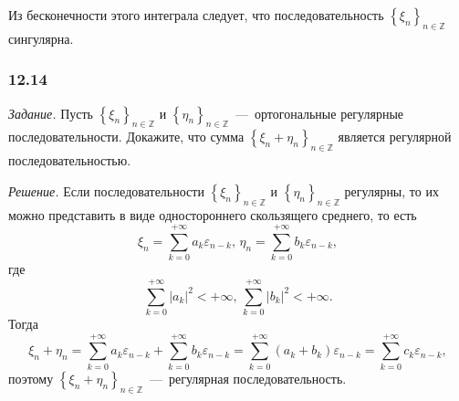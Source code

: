 Из бесконечности этого интеграла следует,
что последовательность $ \left\{ \xi_n \right\}_{n \in \mathbb{Z}}$ сингулярна.

\subsubsection*{12.14}

\textit{Задание.}
Пусть $ \left\{ \xi_n \right\}_{n \in \mathbb{Z}}$ и
$ \left\{ \eta_n \right\}_{n \in \mathbb{Z}}$~---~ортогональные регулярные последовательности.
Докажите, что сумма $ \left\{ \xi_n + \eta_n \right\}_{n \in \mathbb{Z}}$
является регулярной последовательностью.

\textit{Решение.}
Если последовательности $ \left\{ \xi_n \right\}_{n \in \mathbb{Z}}$ и
$ \left\{ \eta_n \right\}_{n \in \mathbb{Z}}$ регулярны,
то их можно представить в виде одностороннего скользящего среднего, то есть
\begin{equation*}
  \xi_n = \sum \limits_{k = 0}^{+\infty } a_k \varepsilon_{n - k}, \,
  \eta_n = \sum \limits_{k = 0}^{+\infty } b_k \varepsilon_{n - k},
\end{equation*}
где
\begin{equation*}
  \sum \limits_{k = 0}^{+\infty } \left| a_k \right|^2 < +\infty, \,
  \sum \limits_{k = 0}^{+\infty } \left| b_k \right|^2 < +\infty.
\end{equation*}
Тогда
\begin{equation*}
  \xi_n + \eta_n =
  \sum \limits_{k = 0}^{+\infty } a_k \varepsilon_{n - k} +
  \sum \limits_{k = 0}^{+\infty } b_k \varepsilon_{n - k} =
  \sum \limits_{k = 0}^{+\infty } \left( a_k + b_k \right) \varepsilon_{n - k} =
  \sum \limits_{k = 0}^{+\infty } c_k \varepsilon_{n - k},
\end{equation*}
поэтому $ \left\{ \xi_n + \eta_n \right\}_{n \in \mathbb{Z}}$~---~регулярная последовательность.
